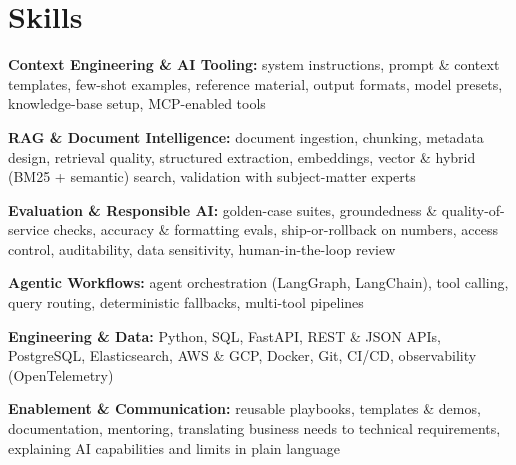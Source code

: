 \documentclass[10pt,a4paper]{article}
\begin{document}
\section{Skills}
\begin{tight}
  \item[\textcolor{accent}{\small$\bullet$}] \textbf{Context Engineering \& AI Tooling:} system instructions, prompt \& context templates, few-shot examples, reference material, output formats, model presets, knowledge-base setup, MCP-enabled tools
  \item[\textcolor{accent}{\small$\bullet$}] \textbf{RAG \& Document Intelligence:} document ingestion, chunking, metadata design, retrieval quality, structured extraction, embeddings, vector \& hybrid (BM25 + semantic) search, validation with subject-matter experts
  \item[\textcolor{accent}{\small$\bullet$}] \textbf{Evaluation \& Responsible AI:} golden-case suites, groundedness \& quality-of-service checks, accuracy \& formatting evals, ship-or-rollback on numbers, access control, auditability, data sensitivity, human-in-the-loop review
  \item[\textcolor{accent}{\small$\bullet$}] \textbf{Agentic Workflows:} agent orchestration (LangGraph, LangChain), tool calling, query routing, deterministic fallbacks, multi-tool pipelines
  \item[\textcolor{accent}{\small$\bullet$}] \textbf{Engineering \& Data:} Python, SQL, FastAPI, REST \& JSON APIs, PostgreSQL, Elasticsearch, AWS \& GCP, Docker, Git, CI/CD, observability (OpenTelemetry)
  \item[\textcolor{accent}{\small$\bullet$}] \textbf{Enablement \& Communication:} reusable playbooks, templates \& demos, documentation, mentoring, translating business needs to technical requirements, explaining AI capabilities and limits in plain language
\end{tight}

\end{document}
